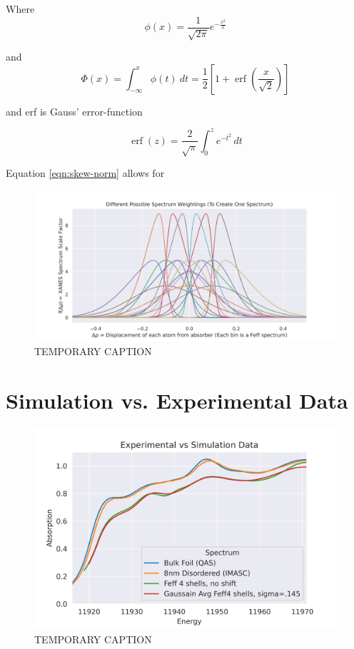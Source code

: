 \noindent
Where
\begin{equation}
	\label{eqn:skew-norm-pdf}
	\phi (x)={\frac  {1}{{\sqrt  {2\pi }}}}e^{{-{\frac  {x^{2}}{2}}}}
\end{equation}

\noindent
and
\begin{equation}
	\label{eqn:skew-norm-cdf}
	\Phi (x)=\int _{{-\infty }}^{{x}}\phi (t)\ dt={\frac  {1}{2}}\left[1+\operatorname {erf}\left({\frac  {x}{{\sqrt  {2}}}}\right)\right]
\end{equation}

\noindent
and erf is Gauss' error-function

\begin{equation}
	\label{eqn:skew-norm-cdf-erf}
	{\displaystyle \operatorname {erf} \left(z\right)={\frac {2}{\sqrt {\pi }}}\int _{0}^{z}e^{-t^{2}}\,dt}
\end{equation}

Equation \ref{eqn:skew-norm} allows for 

\begin{figure}[h!]
	\centering
	\includegraphics[width=\linewidth]{Chapters/Figures/skewnorm_options.png}
	\caption[Simulated Disordered Spectrum Weightings]{TEMPORARY CAPTION}
	\label{fig:skew-norm-options}
\end{figure}


\section{Simulation vs. Experimental Data}

\begin{figure}[h]
	\centering
	\includegraphics[width=.7\linewidth]{Chapters/Figures/bulk_8nm_disorder_experimental_theory_comparison.png}
	\caption[Simulation vs. Experimental]{TEMPORARY CAPTION}
	\label{fig:avg-experimental-vs-simulation}
\end{figure}


